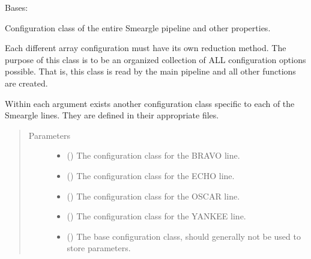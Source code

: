 \documentclass[letterpaper,10pt,english]{sphinxmanual}
\begin{document}
\begin{fulllineitems}
\label{\detokenize{python_docstrings/IfA_Smeargle.yankee.yankee_main:IfA_Smeargle.yankee.yankee_main.SmeargleConfig}}
Bases: {\hyperref[\detokenize{python_docstrings/IfA_Smeargle.yankee.configuration_classes.BaseConfig_file:IfA_Smeargle.yankee.configuration_classes.BaseConfig_file.BaseConfig}]{}}

Configuration class of the entire Smeargle pipeline and other
properties.

Each different array configuration must have its own reduction method.
The purpose of this class is to be an organized collection of ALL
configuration options possible. That is, this class is read by the main
pipeline and all other functions are created.

Within each argument exists another configuration class specific to each
of the Smeargle lines. They are defined in their appropriate files.
\begin{quote}\begin{description}
\item[{Parameters}] \leavevmode\begin{itemize}
\item {} 
 () \textendash{} The configuration class for the BRAVO line.

\item {} 
 () \textendash{} The configuration class for the ECHO line.

\item {} 
 () \textendash{} The configuration class for the OSCAR line.

\item {} 
 () \textendash{} The configuration class for the YANKEE line.

\item {} 
 () \textendash{} The base configuration class, should generally not be used to store
parameters.

\end{itemize}

\end{description}\end{quote}

\end{fulllineitems}
\end{document}
